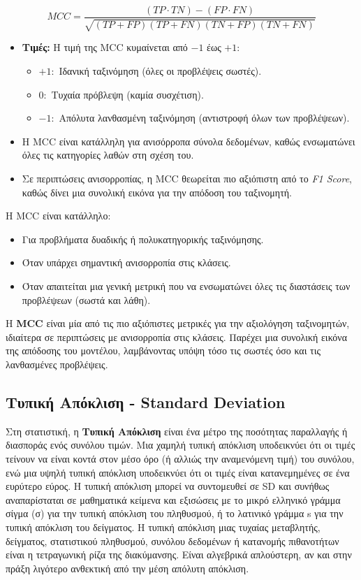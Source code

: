 \documentclass[diploma]{softlab-thesis}
\begin{document}
\[
MCC = \frac{(TP \cdot TN) - (FP \cdot FN)}{\sqrt{(TP + FP)(TP + FN)(TN + FP)(TN + FN)}}
\]

\begin{itemize}
    \item \textbf{Τιμές:}
    Η τιμή της MCC κυμαίνεται από \(-1\) έως \(+1\):
    \begin{itemize}
        \item \(+1:\) Ιδανική ταξινόμηση (όλες οι προβλέψεις σωστές).
        \item \(0:\) Τυχαία πρόβλεψη (καμία συσχέτιση).
        \item \(-1:\) Απόλυτα λανθασμένη ταξινόμηση (αντιστροφή όλων των προβλέψεων).
    \end{itemize}
    
\item Η MCC είναι κατάλληλη για ανισόρροπα σύνολα δεδομένων, καθώς ενσωματώνει όλες τις κατηγορίες λαθών στη σχέση του.

\item  Σε περιπτώσεις ανισορροπίας, η MCC θεωρείται πιο αξιόπιστη από το \textit{F1 Score}, καθώς δίνει μια συνολική εικόνα για την απόδοση του ταξινομητή.
\end{itemize}

Η MCC είναι κατάλληλο:
\begin{itemize}
    \item Για προβλήματα δυαδικής ή πολυκατηγορικής ταξινόμησης.
    \item Όταν υπάρχει σημαντική ανισορροπία στις κλάσεις.
    \item Όταν απαιτείται μια γενική μετρική που να ενσωματώνει όλες τις διαστάσεις των προβλέψεων (σωστά και λάθη).
\end{itemize}

Η \textbf{MCC} είναι μία από τις πιο αξιόπιστες μετρικές για την αξιολόγηση ταξινομητών, ιδιαίτερα σε περιπτώσεις με ανισορροπία στις κλάσεις. Παρέχει μια συνολική εικόνα της απόδοσης του μοντέλου, λαμβάνοντας υπόψη τόσο τις σωστές όσο και τις λανθασμένες προβλέψεις.

\subsection{Τυπική Απόκλιση - Standard Deviation}

Στη στατιστική, η \textbf{Tυπική Aπόκλιση} είναι ένα μέτρο της ποσότητας παραλλαγής ή διασποράς ενός συνόλου τιμών. Μια χαμηλή τυπική απόκλιση υποδεικνύει ότι οι τιμές τείνουν να είναι κοντά στον μέσο όρο (ή αλλιώς την αναμενόμενη τιμή) του συνόλου, ενώ μια υψηλή τυπική απόκλιση υποδεικνύει ότι οι τιμές είναι κατανεμημένες σε ένα ευρύτερο εύρος. Η τυπική απόκλιση μπορεί να συντομευθεί σε SD και συνήθως αναπαρίσταται σε μαθηματικά κείμενα και εξισώσεις με το μικρό ελληνικό γράμμα σίγμα (σ) για την τυπική απόκλιση του πληθυσμού, ή το λατινικό γράμμα s για την τυπική απόκλιση του δείγματος. Η τυπική απόκλιση μιας τυχαίας μεταβλητής, δείγματος, στατιστικού πληθυσμού, συνόλου δεδομένων ή κατανομής πιθανοτήτων είναι η τετραγωνική ρίζα της διακύμανσης. Είναι αλγεβρικά απλούστερη, αν και στην πράξη λιγότερο ανθεκτική από την μέση απόλυτη απόκλιση.
\end{document}

